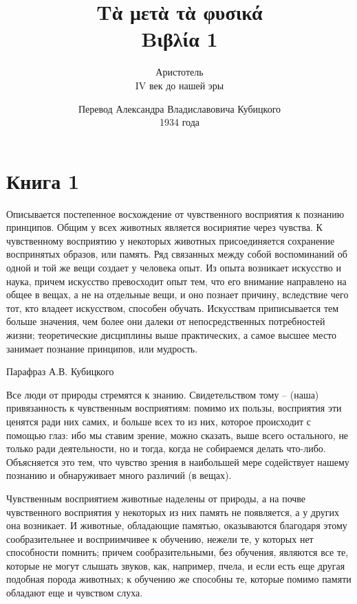 \documentclass[oneside, 17pt, dvipsnames]{extbook}
\title{
    Τὰ μετὰ τὰ φυσικά
    \\
    Βιβλία 1
}
\author{
    Аристотель
    \\
    IV век до нашей эры
}
\date{
    Перевод Александра Владиславовича Кубицкого
    \\
    1934 года
}
\begin{document}
\maketitle
\tableofcontents

\section{Книга 1}

\epigraph{
Описывается постепенное восхождение от чувственного восприятия к познанию принципов. Общим у всех животных является восириятие через чувства. К чувственному восприятию у некоторых животных присоединяется сохранение воспринятых образов, или память. Ряд связанных между собой воспоминаний об одной и той же вещи создает у человека опыт. Из опыта возникает искусство и наука, причем искусство превосходит опыт тем, что его внимание направлено на общее в вещах, а не на отдельные вещи, и оно познает причину, вследствие чего тот, кто владеет искусством, способен обучать. Искусствам приписывается тем больше значения, чем более они далеки от непосредственных потребностей жизни; теоретические дисциплины выше практических, а самое высшее место занимает познание принципов, или мудрость.
}{Парафраз А.В. Кубицкого}

Все люди от природы стремятся к знанию. Свидетельством тому -- (наша) привязанность к чувственным восприятиям: помимо их пользы, восприятия эти ценятся ради них самих, и больше всех то из них, которое происходит с помощью глаз: ибо мы ставим зрение, можно сказать, выше всего остального, не только ради деятельности, но и тогда, когда не собираемся делать что-либо. Объясняется это тем, что чувство зрения в наибольшей мере содействует нашему познанию и обнаруживает много различий (в вещах).

Чувственным восприятием животные наделены от природы, а на почве чувственного восприятия у некоторых из них память не появляется, а у других она возникает. И животные, обладающие памятью, оказываются благодаря этому сообразительнее и восприимчивее к обучению, нежели те, у которых нет способности помнить; причем сообразительными, без обучения, являются все те, которые не могут слышать звуков, как, например, пчела, и если есть еще другая подобная порода животных; к обучению же способны те, которые помимо памяти обладают еще и чувством слуха.
\end{document}
